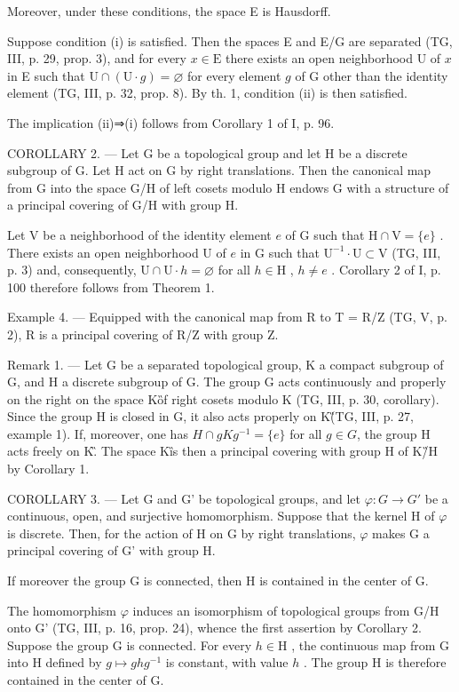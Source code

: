 Moreover, under these conditions, the space E is Hausdorff.

Suppose condition (i) is satisfied. Then the spaces E and E/G are separated (TG, III, p. 29, prop. 3), and for every \(x \in \mathrm{E}\) there exists an open neighborhood U of \(x\) in E such that \(\mathrm{U} \cap (\mathrm{U} \cdot g) = \varnothing\) for every element \(g\) of G other than the identity element (TG, III, p. 32, prop. 8). By th. 1, condition (ii) is then satisfied.

The implication (ii)⇒(i) follows from Corollary 1 of I, p. 96.

COROLLARY 2. --- Let G be a topological group and let H be a discrete subgroup of G. Let H act on G by right translations. Then the canonical map from G into the space G/H of left cosets modulo H endows G with a structure of a principal covering of G/H with group H.

Let V be a neighborhood of the identity element \(e\) of G such that \(\mathrm{H} \cap \mathrm{V} = \{e\}\) . There exists an open neighborhood U of \(e\) in G such that \(\mathrm{U}^{-1} \cdot \mathrm{U} \subset \mathrm{V}\) (TG, III, p. 3) and, consequently, \(\mathrm{U} \cap \mathrm{U} \cdot h = \varnothing\) for all \(h \in \mathrm{H}\) , \(h \neq e\) . Corollary 2 of I, p. 100 therefore follows from Theorem 1.

Example 4. --- Equipped with the canonical map from R to T = R/Z (TG, V, p. 2), R is a principal covering of R/Z with group Z.

Remark 1. --- Let G be a separated topological group, K a compact subgroup of G, and H a discrete subgroup of G. The group G acts continuously and properly on the right on the space K\G of right cosets modulo K (TG, III, p. 30, corollary). Since the group H is closed in G, it also acts properly on K\G (TG, III, p. 27, example 1). If, moreover, one has \(H \cap gKg^{-1} = \{e\}\) for all \(g \in G\), the group H acts freely on K\G. The space K\G is then a principal covering with group H of K\G/H by Corollary 1.

COROLLARY 3. --- Let G and G' be topological groups, and let \(\varphi\colon G \to G'\) be a continuous, open, and surjective homomorphism. Suppose that the kernel H of \(\varphi\) is discrete. Then, for the action of H on G by right translations, \(\varphi\) makes G a principal covering of G' with group H.

If moreover the group G is connected, then H is contained in the center of G.

The homomorphism \(\varphi\) induces an isomorphism of topological groups from G/H onto G' (TG, III, p. 16, prop. 24), whence the first assertion by Corollary 2. Suppose the group G is connected. For every \(h \in \mathrm{H}\) , the continuous map from G into H defined by \(g \mapsto ghg^{-1}\) is constant, with value \(h\) . The group H is therefore contained in the center of G.

